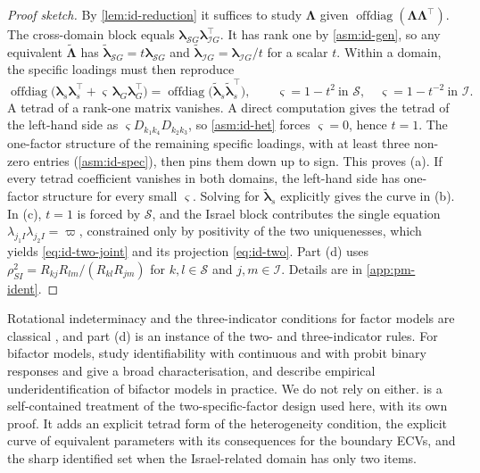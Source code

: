 \begin{proof}[Proof sketch]
By \cref{lem:id-reduction} it suffices to study $\bm\Lambda$ given $\operatorname{offdiag}(\bm\Lambda\bm\Lambda^\top)$. The cross-domain block equals $\bm\lambda_{\mathcal SG}\bm\lambda_{\mathcal IG}^\top$. It has rank one by \cref{asm:id-gen}, so any equivalent $\tilde{\bm\Lambda}$ has $\tilde{\bm\lambda}_{\mathcal SG}=t\bm\lambda_{\mathcal SG}$ and $\tilde{\bm\lambda}_{\mathcal IG}=\bm\lambda_{\mathcal IG}/t$ for a scalar $t$. Within a domain, the specific loadings must then reproduce
\[
  \operatorname{offdiag}\bigl(\bm\lambda_{s}\bm\lambda_{s}^\top+\varsigma\,\bm\lambda_{G}\bm\lambda_{G}^\top\bigr)
  =\operatorname{offdiag}\bigl(\tilde{\bm\lambda}_{s}\tilde{\bm\lambda}_{s}^\top\bigr),
  \qquad \varsigma=1-t^2\ \text{in }\mathcal S,\quad \varsigma=1-t^{-2}\ \text{in }\mathcal I .
\]
A tetrad of a rank-one matrix vanishes. A direct computation gives the tetrad of the left-hand side as $\varsigma D_{k_1k_4}D_{k_2k_3}$, so \cref{asm:id-het} forces $\varsigma=0$, hence $t=1$. The one-factor structure of the remaining specific loadings, with at least three non-zero entries (\cref{asm:id-spec}), then pins them down up to sign. This proves (a). If every tetrad coefficient vanishes in both domains, the left-hand side has one-factor structure for every small $\varsigma$. Solving for $\tilde{\bm\lambda}_s$ explicitly gives the curve in (b). In (c), $t=1$ is forced by $\mathcal S$, and the Israel block contributes the single equation $\lambda_{j_1I}\lambda_{j_2I}=\varpi$, constrained only by positivity of the two uniquenesses, which yields \eqref{eq:id-two-joint} and its projection \eqref{eq:id-two}. Part (d) uses $\rho_{SI}^2=R_{kj}R_{lm}/(R_{kl}R_{jm})$ for $k,l\in\mathcal S$ and $j,m\in\mathcal I$. Details are in \cref{app:pm-ident}.
\end{proof}

\begin{remark}\label{rem:id-literature}
Rotational indeterminacy and the three-indicator conditions for factor models are classical \citep{anderson1956,bollen1989}, and part (d) is an instance of the two- and three-indicator rules. For bifactor models, \citet{fang2021} study identifiability with continuous and with probit binary responses and give a broad characterisation, and \citet{green2018} describe empirical underidentification of bifactor models in practice. We do not rely on either.  is a self-contained treatment of the two-specific-factor design used here, with its own proof. It adds an explicit tetrad form of the heterogeneity condition, the explicit curve of equivalent parameters with its consequences for the boundary ECVs, and the sharp identified set when the Israel-related domain has only two items.
\end{remark}




